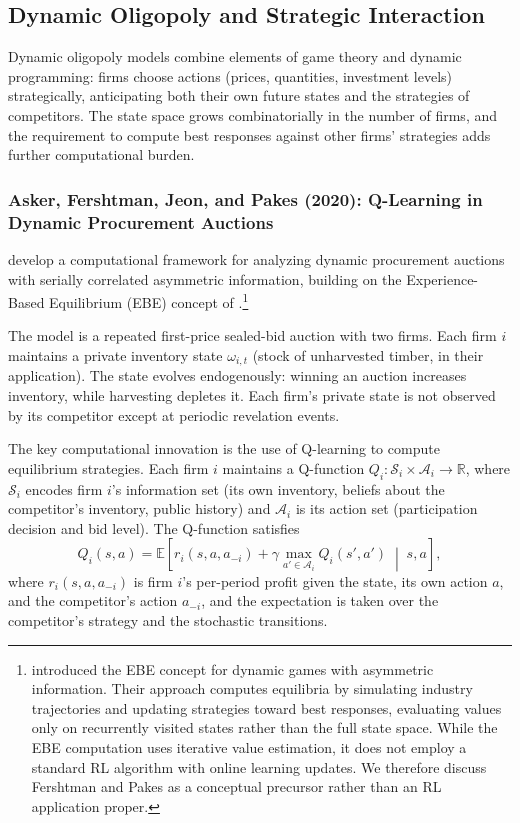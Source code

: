 \subsection{Dynamic Oligopoly and Strategic Interaction}

Dynamic oligopoly models combine elements of game theory and dynamic programming: firms choose actions (prices, quantities, investment levels) strategically, anticipating both their own future states and the strategies of competitors. The state space grows combinatorially in the number of firms, and the requirement to compute best responses against other firms' strategies adds further computational burden.


\subsubsection{Asker, Fershtman, Jeon, and Pakes (2020): Q-Learning in Dynamic Procurement Auctions}

\citet{AskerEtAl2020} develop a computational framework for analyzing dynamic procurement auctions with serially correlated asymmetric information, building on the Experience-Based Equilibrium (EBE) concept of \citet{FershtmanPakes2012}.\footnote{\citet{FershtmanPakes2012} introduced the EBE concept for dynamic games with asymmetric information. Their approach computes equilibria by simulating industry trajectories and updating strategies toward best responses, evaluating values only on recurrently visited states rather than the full state space. While the EBE computation uses iterative value estimation, it does not employ a standard RL algorithm with online learning updates. We therefore discuss Fershtman and Pakes as a conceptual precursor rather than an RL application proper.}

The model is a repeated first-price sealed-bid auction with two firms. Each firm $i$ maintains a private inventory state $\omega_{i,t}$ (stock of unharvested timber, in their application). The state evolves endogenously: winning an auction increases inventory, while harvesting depletes it. Each firm's private state is not observed by its competitor except at periodic revelation events.

The key computational innovation is the use of Q-learning to compute equilibrium strategies. Each firm $i$ maintains a Q-function $Q_i: \mathcal{S}_i \times \mathcal{A}_i \to \mathbb{R}$, where $\mathcal{S}_i$ encodes firm $i$'s information set (its own inventory, beliefs about the competitor's inventory, public history) and $\mathcal{A}_i$ is its action set (participation decision and bid level). The Q-function satisfies
\begin{equation}
Q_i(s, a) = \mathbb{E}\left[r_i(s, a, a_{-i}) + \gamma \max_{a' \in \mathcal{A}_i} Q_i(s', a') \;\middle|\; s, a\right], \label{eq:asker_bellman}
\end{equation}
where $r_i(s, a, a_{-i})$ is firm $i$'s per-period profit given the state, its own action $a$, and the competitor's action $a_{-i}$, and the expectation is taken over the competitor's strategy and the stochastic transitions.

